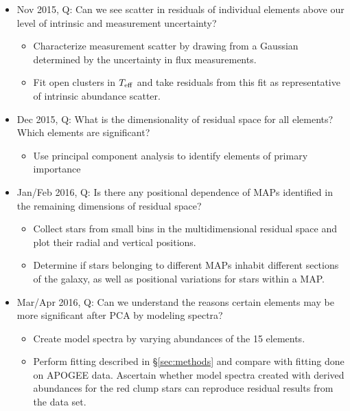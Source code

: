 \documentclass[preprint]{aastex}
\begin{document}
\begin{itemize}
\item Nov 2015, Q: Can we see scatter in residuals of individual elements above our level of intrinsic and measurement uncertainty?
\begin{itemize}
\item Characterize measurement scatter by drawing from a Gaussian determined by the uncertainty in flux measurements.
\item Fit open clusters in $T_{\rm eff}$ and take residuals from this fit as representative of intrinsic abundance scatter.
\end{itemize}
\item Dec 2015, Q: What is the dimensionality of residual space for all elements? Which elements are significant?
\begin{itemize}
\item Use principal component analysis to identify elements of primary importance
\end{itemize}
\item Jan/Feb 2016, Q: Is there any positional dependence of MAPs identified in the remaining dimensions of residual space?
\begin{itemize}
\item Collect stars from small bins in the multidimensional residual space and plot their radial and vertical positions.
\item Determine if stars belonging to different MAPs inhabit different sections of the galaxy, as well as positional variations for stars within a MAP.
\end{itemize}
\item Mar/Apr 2016, Q: Can we understand the reasons certain elements may be more significant after PCA by modeling spectra?
\begin{itemize}
\item Create model spectra by varying abundances of the 15 elements.
\item Perform fitting described in \S\ref{sec:methods} and compare with fitting done on APOGEE data. Ascertain whether model spectra created with derived abundances for the red clump stars can reproduce residual results from the data set.
\end{itemize}
\end{itemize}
\end{document}
